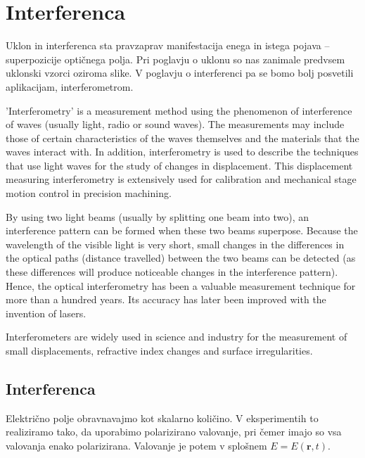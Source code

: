 
\chapter{Interferenca}
Uklon in interferenca sta pravzaprav manifestacija enega in istega pojava 
-- superpozicije optičnega polja. Pri poglavju o uklonu
so nas zanimale predvsem uklonski vzorci oziroma slike. V poglavju
o interferenci pa se bomo bolj posvetili aplikacijam, interferometrom.

'Interferometry' is a measurement method using the phenomenon of interference of waves (usually light, radio or sound waves). The measurements may include those of certain characteristics of the waves themselves and the materials that the waves interact with. In addition, interferometry is used to describe the techniques that use light waves for the study of changes in displacement. This displacement measuring interferometry is extensively used for calibration and mechanical stage motion control in precision machining.

By using two light beams (usually by splitting one beam into two), an interference pattern can be formed when these two beams superpose. Because the wavelength of the visible light is very short, small changes in the differences in the optical paths (distance travelled) between the two beams can be detected (as these differences will produce noticeable changes in the interference pattern). Hence, the optical interferometry has been a valuable measurement technique for more than a hundred years. Its accuracy has later been improved with the invention of lasers. 

Interferometers are widely used in science and industry for the measurement of small displacements, refractive index changes and surface irregularities. 

\section{Interferenca}
Električno polje obravnavajmo kot skalarno količino. V eksperimentih
to realiziramo tako, da uporabimo polarizirano valovanje, pri čemer
imajo so vsa valovanja enako polarizirana. Valovanje je potem v splošnem 
$E= E(\mathbf{r},t)$. 

